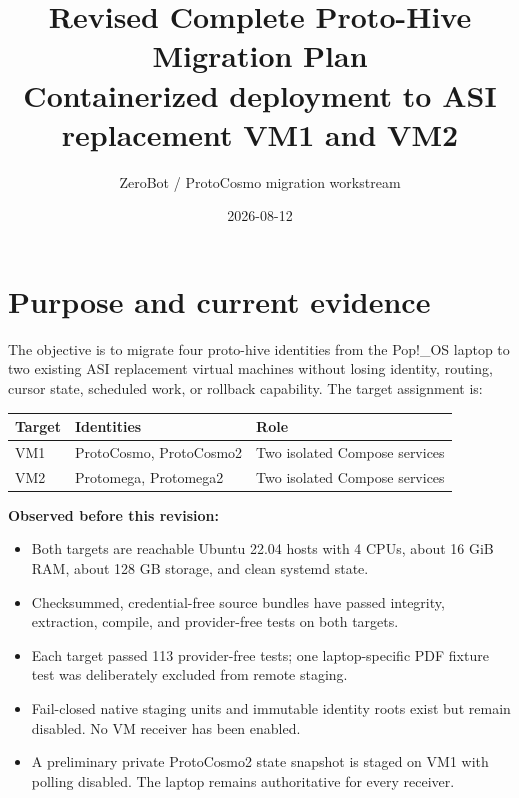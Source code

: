 \documentclass[11pt]{article}
\title{Revised Complete Proto-Hive Migration Plan\\
\large Containerized deployment to ASI replacement VM1 and VM2}
\author{ZeroBot / ProtoCosmo migration workstream}
\date{2026-08-12}
\begin{document}
\maketitle

\begin{center}
\end{center}

\section{Purpose and current evidence}

The objective is to migrate four proto-hive identities from the Pop!\_OS laptop
to two existing ASI replacement virtual machines without losing identity,
routing, cursor state, scheduled work, or rollback capability. The target
assignment is:

\begin{center}
\begin{tabular}{lll}
\toprule
Target & Identities & Role \\
\midrule
VM1 & ProtoCosmo, ProtoCosmo2 & Two isolated Compose services \\
VM2 & Protomega, Protomega2 & Two isolated Compose services \\
\bottomrule
\end{tabular}
\end{center}

\textbf{Observed before this revision:}
\begin{itemize}
\item Both targets are reachable Ubuntu 22.04 hosts with 4 CPUs, about 16 GiB
RAM, about 128 GB storage, and clean systemd state.
\item Checksummed, credential-free source bundles have passed integrity,
extraction, compile, and provider-free tests on both targets.
\item Each target passed 113 provider-free tests; one laptop-specific PDF
fixture test was deliberately excluded from remote staging.
\item Fail-closed native staging units and immutable identity roots exist but
remain disabled. No VM receiver has been enabled.
\item A preliminary private ProtoCosmo2 state snapshot is staged on VM1 with
polling disabled. The laptop remains authoritative for every receiver.
\end{itemize}
\end{document}
